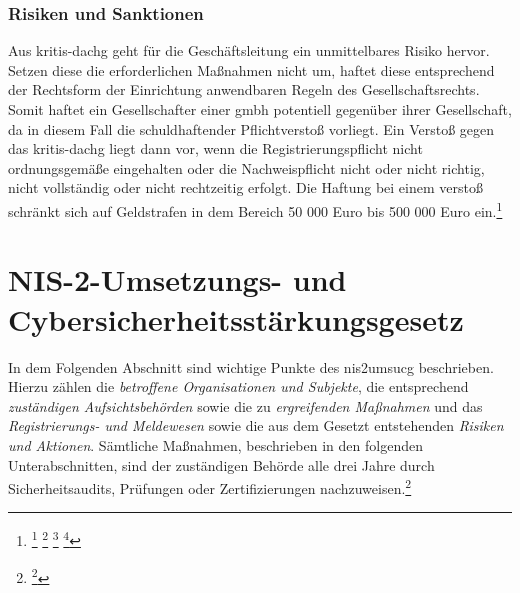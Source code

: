 \documentclass[11pt,a4paper,hidelinks]{article}   %
\begin{document}
            \subsubsection{Risiken und Sanktionen}
                Aus \gls{kritis-dachg} geht für die Geschäftsleitung ein unmittelbares Risiko hervor. Setzen diese die erforderlichen Maßnahmen nicht um, haftet diese entsprechend der Rechtsform der Einrichtung anwendbaren Regeln des Gesellschaftsrechts. Somit haftet ein Gesellschafter einer \gls{gmbh} potentiell gegenüber ihrer Gesellschaft, da in diesem Fall die schuldhaftender Pflichtverstoß vorliegt. Ein Verstoß gegen das \gls{kritis-dachg} liegt dann vor, wenn die Registrierungspflicht nicht ordnungsgemäße eingehalten oder die Nachweispflicht nicht oder nicht richtig, nicht vollständig oder nicht rechtzeitig erfolgt. Die Haftung bei einem verstoß schränkt sich auf Geldstrafen in dem Bereich 50 000 Euro bis 500 000 Euro ein.\footnote{
                    \footcite[Vgl.][, §20, Absatz 2]{KRITIS-DachG}
                    \footcite[Vgl.][, §24, Absatz 2]{KRITIS-DachG}
                    \footcite[Vgl.][, §13, Absatz 2]{GmbHG}
                    \footcite[Vgl.][, §43, Absatz 2]{GmbHG}
                }

    \section{NIS-2-Umsetzungs- und Cybersicherheitsstärkungsgesetz}\label{sec:NIS2UmsuCG} %
        In dem Folgenden Abschnitt sind wichtige Punkte des \gls{nis2umsucg} beschrieben. Hierzu zählen die \emph{betroffene Organisationen und Subjekte}, die entsprechend \emph{zuständigen Aufsichtsbehörden} sowie die zu \emph{ergreifenden Maßnahmen} und das \emph{Registrierungs- und Meldewesen} sowie die aus dem Gesetzt entstehenden \emph{Risiken und Aktionen}. Sämtliche Maßnahmen, beschrieben in den folgenden Unterabschnitten, sind der zuständigen Behörde alle drei Jahre durch Sicherheitsaudits, Prüfungen oder Zertifizierungen nachzuweisen.\footnote{
            \footcite[Vgl.][, §39 Absatz 1]{NIS2UmsuCG}
        }
\end{document}

